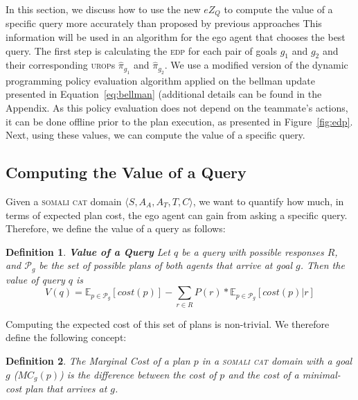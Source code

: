 \documentclass[letterpaper]{article}
\newtheorem{definition}{Definition}
\begin{document}
In this section, we discuss how to use the new $eZ_Q$ to compute the value of a specific query more accurately than proposed by previous approaches
This information will be used in an algorithm for the ego agent that chooses the best query. %
The first step is calculating the \textsc{edp} for each pair of goals $g_1$ and $g_2$ and their corresponding \textsc{urop}s $\hat{\pi}_{g_1}$ and $\hat{\pi}_{g_2}$. %
We use a modified version of the dynamic programming policy evaluation algorithm \cite{bellman1966dynamic} applied on the bellman update presented in Equation~\ref{eq:bellman} (additional details can be found in the Appendix. 
As this policy evaluation does not depend on the teammate's actions, it can be done offline prior to the plan execution, as presented in Figure~\ref{fig:edp}. Next, using these values, we can compute the value of a specific query.

\subsection{Computing the Value of a Query}

Given a \textsc{somali cat} domain $\langle S, A_A, A_T, T, C\rangle$, we want to 
quantify how much, in terms of expected plan cost, the ego agent can gain from asking a specific query.
Therefore, we define the value of a query as follows:
\begin{definition}
\textbf{Value of a Query} Let $q$ be a query with possible responses $R$, and $\mathcal{P}_g$ be the set of possible plans of both agents that arrive at goal $g$. Then the value of query $q$ is
\begin{equation}
    V(q) = \mathbb{E}_{p\in \mathcal{P}_g}[cost(p)] - \sum\limits_{r\in R}P(r)*\mathbb{E}_{p\in \mathcal{P}_g}[cost(p) | r]
\label{eq:value}
\end{equation}
\end{definition}

\noindent Computing the expected cost of this set of plans is non-trivial. We therefore define the following concept:
\begin{definition}
The \emph{Marginal Cost} of a plan $p$ in a \textsc{somali cat} domain with a goal $g$ ($MC_g(p)$) is the difference between the cost of $p$ and the cost of a minimal-cost plan that arrives at $g$.
\label{def:mc}
\end{definition}
\end{document}
